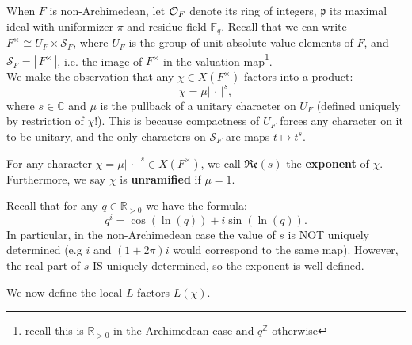 \documentclass[11pt, x11names]{book}
\newcommand{\zz}{\mathbb{Z}}
\newcommand{\rr}{\mathbb{R}}
\newcommand{\cc}{\mathbb{C}}
\newcommand{\ff}{\mathbb{F}}
\newcommand{\pp}{\mathfrak{p}}
\newcommand{\cals}{\mathcal{S}}
\newcommand{\abs}[1]{\left| \, #1  \,\right|}
\newcommand{\re}[1]{\mathfrak{Re} \left( #1 \right)}
\begin{document}
When $F$ is non-Archimedean, let $\mathcal{O}_F$ denote its ring of integers, $\pp$ its maximal ideal with uniformizer $\pi$ and residue field $\ff_q$. Recall that we can write $F^\times \cong U_F \times \cals_F$, where $U_F$ is the group of unit-absolute-value elements of $F$, and $\cals_F = \abs{F^\times}$, i.e. the image of $F^\times$ in the valuation map\footnote{recall this is $\rr_{> 0}$ in the Archimedean case and $q^\zz$ otherwise}.\\
We make the observation that any $\chi \in X(F^\times)$ factors into a product:
\begin{equation*}
    \chi = \mu \abs{\cdot}^s,
\end{equation*}
where $s \in \cc$ and $\mu$ is the pullback of a unitary character on $U_F$ (defined uniquely by restriction of $\chi$!). This is because compactness of $U_F$ forces any character on it to be unitary, and the only characters on $\cals_F$ are maps $t \mapsto t^s$.
\begin{defn}
\label{def: exponent and unramified character}
    For any character $\chi = \mu \abs{\cdot}^s \in X(F^\times)$, we call $\re{s}$ the \textbf{exponent} of $\chi$.\\
    Furthermore, we say $\chi$ is \textbf{unramified} if $\mu = 1$.
\end{defn}
\begin{warning}
    Recall that for any $q \in \rr_{> 0}$ we have the formula:
    \begin{equation*}
        q^i = \cos(\ln(q)) + i \sin(\ln(q)).
    \end{equation*}
    In particular, in the non-Archimedean case the value of $s$ is NOT uniquely determined (e.g $i$ and $(1 + 2\pi)i$ would correspond to the same map). However, the real part of $s$ IS uniquely determined, so the exponent is well-defined.
\end{warning}

We now define the local $L$-factors $L(\chi)$.
\end{document}
